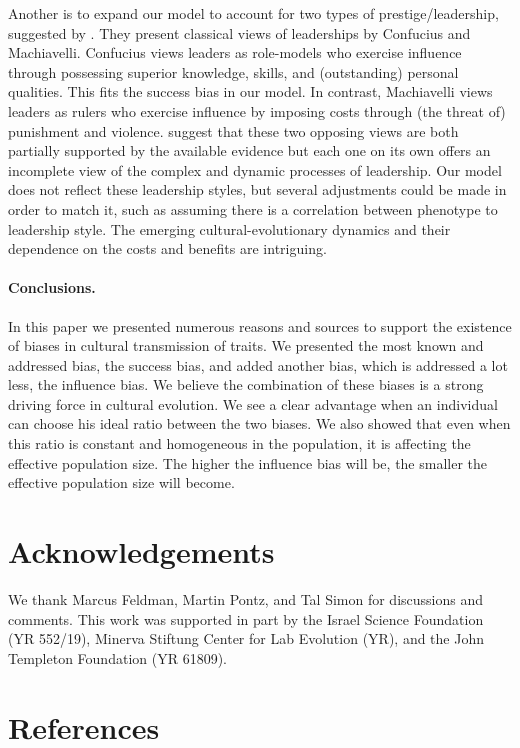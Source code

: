 \documentclass[12pt]{extarticle}
\begin{document}
Another is to expand our model to account for two types of prestige/leadership, suggested by \citet{dual_leadership}.
They present classical views of leaderships by Confucius and Machiavelli. Confucius views leaders as role-models who exercise influence through possessing superior knowledge, skills, and (outstanding) personal qualities. This fits the success bias in our model. 
In contrast, Machiavelli views leaders as rulers who exercise influence by imposing costs through (the threat of) punishment and violence. 
\citet{dual_leadership} suggest that these two opposing views are both partially supported by the available evidence but each one on its own offers an incomplete view of the complex and dynamic processes of leadership. 
Our model does not reflect these leadership styles, but several adjustments could be made in order to match it, such as assuming there is a correlation between phenotype to leadership style. 
The emerging cultural-evolutionary dynamics and their dependence on the costs and benefits are intriguing.

\paragraph{Conclusions.}
In this paper we presented numerous reasons and sources to support the existence of biases in cultural transmission of traits. We presented the most known and addressed bias, the success bias, and added another bias, which is addressed a lot less, the influence bias. We believe the combination of these biases is a strong driving force in cultural evolution. We see a clear advantage when an individual can choose his ideal ratio between the two biases.
We also showed that even when this ratio is constant and homogeneous in the population, it is affecting the effective population size. The higher the influence bias will be, the smaller the effective population size will become.

{\small
\section{Acknowledgements}
We thank Marcus Feldman, Martin Pontz, and Tal Simon for discussions and comments.
This work was supported in part by 
the Israel Science Foundation (YR 552/19),
Minerva Stiftung Center for Lab Evolution (YR),
and 
the John Templeton Foundation (YR 61809).
}

\section{References}
\nolinenumbers

%


\pagebreak
\end{document}
